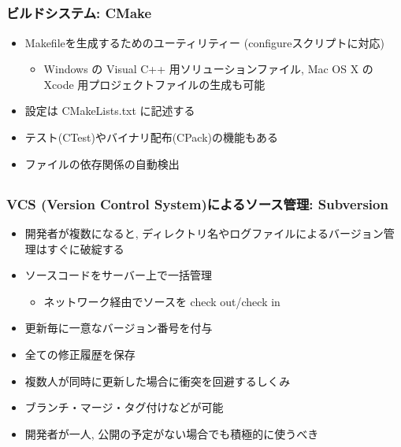 \subsection*{\redm\whitem\greenb}
\begin{frame}
  \frametitle{ビルドシステム: CMake}
  \begin{itemize}
    \setlength{\itemsep}{1em}
  \item Makefileを生成するためのユーティリティー (configureスクリプトに対応)
    \begin{itemize}
    \item Windows の Visual C++ 用ソリューションファイル, Mac OS X の Xcode 用プロジェクトファイルの生成も可能
    \end{itemize}
  \item 設定は CMakeLists.txt に記述する
  \item テスト(CTest)やバイナリ配布(CPack)の機能もある
  \item ファイルの依存関係の自動検出
  \end{itemize}
\end{frame}

\subsection*{\redm\whitem\greenb}
\begin{frame}
  \frametitle{VCS (Version Control System)によるソース管理: Subversion}
  \begin{itemize}
  \item 開発者が複数になると, ディレクトリ名やログファイルによるバージョン管理はすぐに破綻する
  \item ソースコードをサーバー上で一括管理
    \begin{itemize}
    \item ネットワーク経由でソースを check out/check in
    \end{itemize}
  \item 更新毎に一意なバージョン番号を付与
  \item 全ての修正履歴を保存
  \item 複数人が同時に更新した場合に衝突を回避するしくみ
  \item ブランチ・マージ・タグ付けなどが可能
  \item 開発者が一人, 公開の予定がない場合でも積極的に使うべき
  \end{itemize}
\end{frame}

